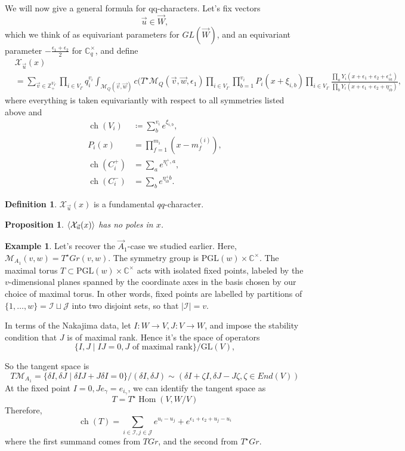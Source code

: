 \documentclass[leqno, openany]{memoir}
\newtheorem{prop}[thm]{Proposition}
\theoremstyle{definition}
\newtheorem{defn}[thm]{Definition}
\newtheorem{exm}[thm]{Example}
\theoremstyle{remark}
\theoremstyle{plain}
\theoremstyle{definition}
\theoremstyle{remark}
\newcommand{\mc}[1]{\mathcal{#1}}
\newcommand{\mr}[1]{\mathrm{#1}}
\newcommand{\GL}{\mr{GL}}
\newcommand{\PGL}{\mr{PGL}}
\DeclareMathOperator{\Hom}{Hom}
\DeclareMathOperator{\ch}{ch}
\begin{document}
We will now give a general formula for qq-characters. 
Let's fix vectors 
\[
\vec{u} \in \vec{W},
\]
which we think of as equivariant parameters for $GL(\vec{W})$, and an equivariant parameter $-\frac{\epsilon_1 + \epsilon_2}{2}$ for $\mathbb{C}^\times_q$, and define 
\begin{align*}
    &\mathcal{X}_{\vec{u}}(x) \\&= \sum_{\vec{v} \in \mathbb{Z}^{V_\Gamma}_+}\prod_{i \in V_\Gamma} q_i^{v_i}  \int_{\mathcal{M}_Q(\vec{v},\vec{w})} c(T^\star \mathcal{M}_Q(\vec{v},\vec{w}, \epsilon_1) \prod_{i \in V_\Gamma} \prod_{b = 1}^{v_i} P_i(x + \xi_{i, b}) \prod_{i \in V_\Gamma} \frac{\prod_a Y_i (x + \epsilon_1 + \epsilon_2 + \epsilon_{ia}^+)}{\prod_b Y_i(x + \epsilon_1 + \epsilon_2 + \eta_{ib}^-)},
\end{align*}
where everything is taken equivariantly with respect to all symmetries listed above and
\begin{align*}
    \ch(V_i) &\coloneqq \sum_b^{v_i} e^{\xi_{i,b}}, \\
    P_i(x) &= \prod_{f = 1}^{m_i} (x - m_f^{(i)}), \\
    \ch(C_i^+) &= \sum_a e^{\eta_i^+,a}, \\
    \ch(C_i^-) &=\sum_b e^{\eta^+_{ib} b}.
\end{align*}


\begin{defn}
$\mathcal{X}_{\vec{u}}(x)$ is a fundamental $qq$-character. 
\end{defn}
\begin{prop}
$\ev{ \mathcal{X}_{\vec{u}}(x) }$ has no poles in $x$.
\end{prop}

\begin{exm}
    Let's recover the $\vec{A}_1$-case we studied earlier. Here, $\mc{M}_{A_1}(v,w) = T^\star Gr(v,w)$. The symmetry group is $\mr{PGL}(w) \times \mathbb{C}^\times$. 
The maximal torus $T \subset \PGL(w) \times \mathbb{C}^\times$ acts with isolated fixed points, labeled by the $v$-dimensional planes spanned by the coordinate axes in the basis chosen by our choice of maximal torus. 
In other words, fixed points are labelled by partitions of $\{1,\dots,w\} = \mathcal{I} \sqcup \mathcal{J}$ into two disjoint sets, so that $|\mathcal{I}| = v$. 

In terms of the Nakajima data, let $I : W \to V, J : V \to W$, and impose the stability condition that $J$ is of maximal rank.
Hence it's the space of operators 
\[
\{ I,J \mid IJ =0, J\text{ of maximal rank}\}/\GL(V),
\]

So the tangent space is 
\[
T\mathcal{M}_{A_1} = \{ \delta I, \delta J \mid  \delta I J + J \delta I = 0\}/(\delta I , \delta J) \sim (\delta I + \zeta I, \delta J  - J \zeta, \zeta \in End(V))
\]
At the fixed point $I = 0, Je_\gamma = e_{i_\gamma}$, we can identify the tangent space as 
\[
T = T^\star \Hom(V,W/V)
\]
Therefore, 
\[
\ch(T) = \sum_{i \in \mathcal{I}, j \in \mathcal{J}} e^{u_i - u_j} + e^{\epsilon_1 + \epsilon_2 + u_j - u_i}
\]
where the first summand comes from $TGr$, and the second from $T^\star Gr$.
\end{exm}
\end{document}
